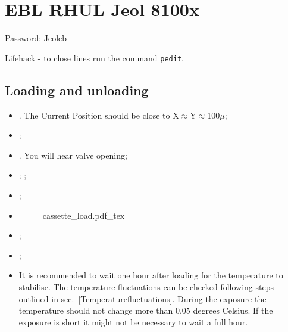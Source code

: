 
\section{EBL RHUL Jeol 8100x}
Password: Jeoleb%

\begin{framed}\noindent
  Lifehack - to close lines run the command \texttt{pedit}.
\end{framed}

\subsection{Loading and unloading}
\label{sec:loading-unloading}

\begin{itemize}
\item  {}.  The {Current Position} should be close to X$\approx$Y$\approx$100$\mu$;
\item {};
\item {}.
  You will hear valve opening;
\item {}; ;
\item   {};
\item {}
  \begin{figure}[h]
    \centering
    \def\svgwidth{6cm}{cassette_load.pdf_tex}
  \end{figure}

\item {};
\item {};
\item It is  recommended to wait one  hour after loading for  the temperature to
  stabilise.   The  temperature  fluctuations  can be  checked  following  steps
  outlined  in  sec.~\ref{Temperaturefluctuations}.   During  the  exposure  the
  temperature  should not  change  more  than $0.05$  degrees  Celsius.  If  the
  exposure is short it might not be necessary to wait a full hour.
\end{itemize}

